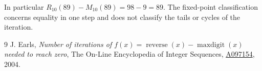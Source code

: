 \documentclass[11pt]{article}
\begin{document}
In particular \(R_{10}(89)-M_{10}(89)=98-9=89\). The fixed-point classification concerns equality in one step and does not classify the tails or cycles of the iteration.

\begin{thebibliography}{9}
J. Earls, \emph{Number of iterations of \(f(x)=\operatorname{reverse}(x)-\operatorname{maxdigit}(x)\) needed to reach zero}, The On-Line Encyclopedia of Integer Sequences,
\href{https://oeis.org/A097154}{A097154}, 2004.
\end{thebibliography}
\end{document}
